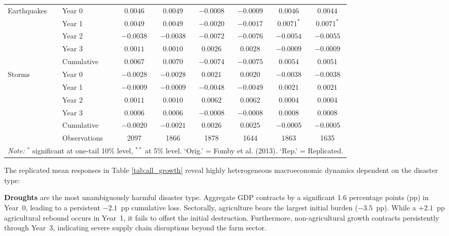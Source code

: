 \documentclass[11pt, a4paper]{article}
\begin{document}
\begin{table}[H]
{\begin{tabular}{llcccccc}
        Earthquakes & Year 0            & $0.0046$       & $0.0049$       & $-0.0008$      & $-0.0009$      & $0.0046$       & $0.0044$ \\
                    & Year 1            & $0.0049$       & $0.0049$       & $-0.0020$      & $-0.0017$      & $0.0071^{*}$   & $0.0071^{*}$ \\
                    & Year 2            & $-0.0038$      & $-0.0038$      & $-0.0072$      & $-0.0076$      & $-0.0054$      & $-0.0055$ \\
                    & Year 3            & $0.0011$       & $0.0010$       & $0.0026$       & $0.0028$       & $-0.0009$      & $-0.0009$ \\
                    & Cumulative        & $0.0067$       & $0.0070$       & $-0.0074$      & $-0.0075$      & $0.0054$       & $0.0051$ \\
        [0.5ex]
        Storms      & Year 0            & $-0.0028$      & $-0.0028$      & $0.0021$       & $0.0020$       & $-0.0038$      & $-0.0038$ \\
                    & Year 1            & $-0.0009$      & $-0.0009$      & $-0.0048$      & $-0.0049$      & $0.0021$       & $0.0021$ \\
                    & Year 2            & $0.0011$       & $0.0010$       & $0.0062$       & $0.0062$       & $0.0004$       & $0.0004$ \\
                    & Year 3            & $0.0006$       & $0.0006$       & $-0.0008$      & $-0.0008$      & $0.0008$       & $0.0008$ \\
                    & Cumulative        & $-0.0020$      & $-0.0021$      & $0.0026$       & $0.0025$       & $-0.0005$      & $-0.0005$ \\
        \midrule
                    & Observations      & 2097           & 1866           & 1878           & 1644           & 1863           & 1635 \\
        \bottomrule
        \multicolumn{8}{l}{\scriptsize \textit{Note:} $^{*}$ significant at one-tail 10\% level, $^{**}$ at 5\% level. `Orig.' = Fomby et al. (2013). `Rep.' = Replicated.}
    \end{tabular}
    }
\end{table}

The replicated mean responses in Table \ref{tab:all_growth} reveal highly heterogeneous macroeconomic dynamics dependent on the disaster type:

\textbf{Droughts} are the most unambiguously harmful disaster type. Aggregate GDP contracts by a significant 1.6 percentage points (pp) in Year~0, leading to a persistent $-2.1$~pp cumulative loss. Sectorally, agriculture bears the largest initial burden ($-3.5$~pp). While a $+2.1$~pp agricultural rebound occurs in Year~1, it fails to offset the initial destruction. Furthermore, non-agricultural growth contracts persistently through Year~3, indicating severe supply chain disruptions beyond the farm sector.
\end{document}

